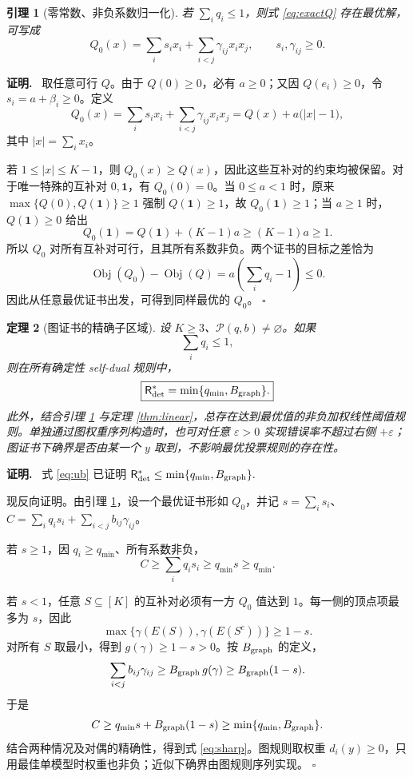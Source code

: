 \documentclass[11pt,a4paper]{ctexart}
\newtheorem{theorem}{定理}[section]
\newtheorem{lemma}[theorem]{引理}
\theoremstyle{definition}
\newenvironment{proofcn}{\par\noindent\textbf{证明.}\ }{\hfill $\square$\par}
\newcommand{\PP}{\mathcal P}
\newcommand{\one}{\mathbf 1}
\newcommand{\Risk}{\mathsf R}
\begin{document}
\begin{lemma}[零常数、非负系数归一化]\label{lem:normalization}
若 $\sum_iq_i\le1$，则式 \eqref{eq:exactQ} 存在最优解，可写成
\begin{equation}\label{eq:Q0}
Q_0(x)=\sum_i s_ix_i+\sum_{i<j}\gamma_{ij}x_ix_j,
\qquad s_i,\gamma_{ij}\ge0.
\end{equation}
\end{lemma}
\begin{proofcn}
取任意可行 $Q$。由于 $Q(0)\ge0$，必有 $a\ge0$；又因 $Q(e_i)\ge0$，令 $s_i=a+\beta_i\ge0$。定义
\[
Q_0(x)=\sum_is_ix_i+\sum_{i<j}\gamma_{ij}x_ix_j
=Q(x)+a\bigl(|x|-1\bigr),
\]
其中 $|x|=\sum_ix_i$。

若 $1\le|x|\le K-1$，则 $Q_0(x)\ge Q(x)$，因此这些互补对的约束均被保留。对于唯一特殊的互补对 $0,\one$，有 $Q_0(0)=0$。当 $0\le a<1$ 时，原来 $\max\{Q(0),Q(\one)\}\ge1$ 强制 $Q(\one)\ge1$，故 $Q_0(\one)\ge1$；当 $a\ge1$ 时，$Q(\one)\ge0$ 给出
\[
Q_0(\one)=Q(\one)+(K-1)a\ge(K-1)a\ge1.
\]
所以 $Q_0$ 对所有互补对可行，且其所有系数非负。两个证书的目标之差恰为
\[
\operatorname{Obj}(Q_0)-\operatorname{Obj}(Q)
=a\left(\sum_iq_i-1\right)\le0.
\]
因此从任意最优证书出发，可得到同样最优的 $Q_0$。
\end{proofcn}

\begin{theorem}[图证书的精确子区域]\label{thm:sharp}
设 $K\ge3$、$\PP(q,b)\ne\varnothing$。如果
\[
\boxed{\sum_iq_i\le1,}
\]
则在所有确定性 self-dual 规则中，
\begin{equation}\label{eq:sharp}
\boxed{\Risk^*_{\rm det}=\min\{q_{\min},B_{\rm graph}\}.}
\end{equation}
此外，结合引理 \ref{lem:normalization} 与定理 \ref{thm:linear}，总存在达到最优值的非负加权线性阈值规则。单独通过图权重序列构造时，也可对任意 $\varepsilon>0$ 实现错误率不超过右侧 $+\varepsilon$；图证书下确界是否由某一个 $y$ 取到，不影响最优投票规则的存在性。
\end{theorem}
\begin{proofcn}
式 \eqref{eq:ub} 已证明
\(
\Risk^*_{\rm det}\le\min\{q_{\min},B_{\rm graph}\}.
\)

现反向证明。由引理 \ref{lem:normalization}，设一个最优证书形如 $Q_0$，并记 $s=\sum_i s_i$、$C=\sum_iq_is_i+\sum_{i<j}b_{ij}\gamma_{ij}$。

若 $s\ge1$，因 $q_i\ge q_{\min}$、所有系数非负，
\[
C\ge\sum_iq_is_i\ge q_{\min}s\ge q_{\min}.
\]

若 $s<1$，任意 $S\subseteq[K]$ 的互补对必须有一方 $Q_0$ 值达到 $1$。每一侧的顶点项最多为 $s$，因此
\[
\max\{\gamma(E(S)),\gamma(E(S^c))\}\ge1-s.
\]
对所有 $S$ 取最小，得到 $g(\gamma)\ge1-s>0$。按 $B_{\rm graph}$ 的定义，
\[
\sum_{i<j}b_{ij}\gamma_{ij}\ge B_{\rm graph}\,g(\gamma)
\ge B_{\rm graph}(1-s).
\]
于是
\[
C\ge q_{\min}s+B_{\rm graph}(1-s)
\ge\min\{q_{\min},B_{\rm graph}\}.
\]
结合两种情况及对偶的精确性，得到式 \eqref{eq:sharp}。图规则取权重 $d_i(y)\ge0$，只用最佳单模型时权重也非负；近似下确界由图规则序列实现。
\end{proofcn}
\end{document}
